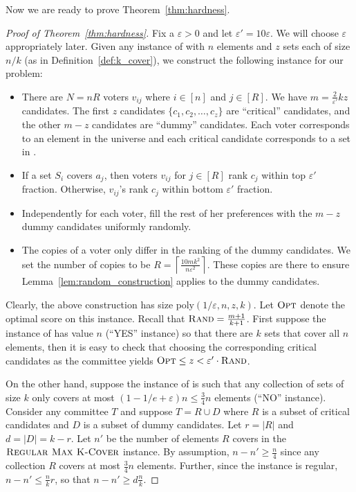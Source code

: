 Now we are ready to prove Theorem~\ref{thm:hardness}.
\begin{proof}[Proof of Theorem~\ref{thm:hardness}]
Fix a $\varepsilon > 0$ and let $\varepsilon' = 10 \varepsilon$.  We will choose $\varepsilon$ appropriately later. Given any instance of \rc{} with $n$ elements and $z$ sets each of size $n/k$ (as in Definition~\ref{def:k_cover}), we construct the following instance for our problem:
\begin{itemize}
    \item There are $N = n R$ voters $v_{ij}$ where $i \in [n]$ and $j \in [R]$.  We have $m = \frac{2}{\varepsilon'} k z$ candidates. The first $z$ candidates $\{c_1, c_2, \ldots, c_z\}$ are ``critical'' candidates, and the other $m-z$ candidates are ``dummy'' candidates. Each voter corresponds to an element in the universe and each critical candidate corresponds to a set in \rc{}. 
    \item If a set $S_i$ covers $a_j$, then voters $v_{ij}$ for $j \in [R]$ rank $c_j$ within top $\varepsilon'$ fraction. Otherwise, $v_{ij}$'s rank $c_j$ within bottom $\varepsilon'$ fraction.
    \item Independently for each voter, fill the rest of her preferences with the $m - z$ dummy candidates uniformly randomly. 
    \item  The copies of a voter only differ in the ranking of the dummy candidates. We set the number of copies to be $R = \left\lceil \frac{10 m k^2}{n \varepsilon^2} \right\rceil$. These copies are there to ensure Lemma~\ref{lem:random_construction} applies to the dummy candidates.
\end{itemize}

Clearly, the above construction has size $\mbox{poly}(1/\varepsilon,n,z,k)$. Let ${\normalfont\textsc{Opt}}$ denote the optimal score on this instance. Recall that ${\normalfont\textsc{Rand}} = \frac{m+1}{k+1}$. First suppose the instance of \rc{} has value $n$ (``YES'' instance) so that there are $k$ sets that cover all $n$ elements, then it is easy to check that choosing the corresponding critical candidates as the committee yields ${\normalfont\textsc{Opt}} \le z < \varepsilon' \cdot {\normalfont\textsc{Rand}}$. 

On the other hand, suppose the instance of \rc{} is such that any collection of sets of size $k$ only covers at most $(1-1/e + \varepsilon)n \le \frac{3}{4} n$ elements (``NO'' instance). Consider any committee $T$ and suppose $T = R \cup D$ where $R$ is a subset of critical candidates and $D$ is a subset of dummy candidates. Let $r = |R|$ and $d = |D| = k - r$. Let $n'$ be the number of elements $R$ covers in the ${\normalfont\textsc{Regular Max K-Cover}}{}$ instance. By assumption, $n - n' \ge \frac{n}{4}$ since any collection $R$ covers at most $\frac{3}{4} n$ elements. Further, since the instance is regular, $n - n' \le \frac{n}{k} r$, so that $n - n' \ge d \frac{n}{k}$.


\end{proof}
